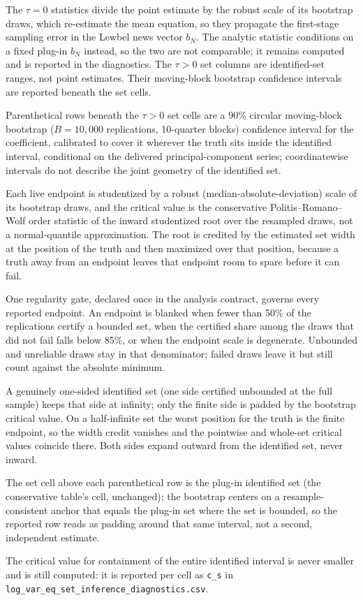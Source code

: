 \begin{table}[!htbp]
\begin{threeparttable}
\begin{tablenotes}[flushleft]
\item The $\tau{=}0$ statistics divide the point estimate by the robust scale of its bootstrap draws, which re-estimate the mean equation, so they propagate the first-stage sampling error in the Lewbel news vector $b_N$. The analytic statistic conditions on a fixed plug-in $b_N$ instead, so the two are not comparable; it remains computed and is reported in the diagnostics. The $\tau{>}0$ set columns are identified-set ranges, not point estimates. Their moving-block bootstrap confidence intervals are reported beneath the set cells.
\item Parenthetical rows beneath the $\tau{>}0$ set cells are a 90\% circular moving-block bootstrap ($B=10{,}000$ replications, 10-quarter blocks) confidence interval for the coefficient, calibrated to cover it wherever the truth sits inside the identified interval, conditional on the delivered principal-component series; coordinatewise intervals do not describe the joint geometry of the identified set.
\item Each live endpoint is studentized by a robust (median-absolute-deviation) scale of its bootstrap draws, and the critical value is the conservative Politis--Romano--Wolf order statistic of the inward studentized root over the resampled draws, not a normal-quantile approximation. The root is credited by the estimated set width at the position of the truth and then maximized over that position, because a truth away from an endpoint leaves that endpoint room to spare before it can fail.
\item One regularity gate, declared once in the analysis contract, governs every reported endpoint. An endpoint is blanked when fewer than 50\% of the replications certify a bounded set, when the certified share among the draws that did not fail falls below 85\%, or when the endpoint scale is degenerate. Unbounded and unreliable draws stay in that denominator; failed draws leave it but still count against the absolute minimum.
\item A genuinely one-sided identified set (one side certified unbounded at the full sample) keeps that side at infinity; only the finite side is padded by the bootstrap critical value. On a half-infinite set the worst position for the truth is the finite endpoint, so the width credit vanishes and the pointwise and whole-set critical values coincide there. Both sides expand outward from the identified set, never inward.
\item The set cell above each parenthetical row is the plug-in identified set (the conservative table's cell, unchanged); the bootstrap centers on a resample-consistent anchor that equals the plug-in set where the set is bounded, so the reported row reads as padding around that same interval, not a second, independent estimate.
\item The critical value for containment of the entire identified interval is never smaller and is still computed: it is reported per cell as \texttt{c\_s} in \texttt{log\_var\_eq\_set\_inference\_diagnostics.csv}.
\end{tablenotes}
\end{threeparttable}
\end{table}
